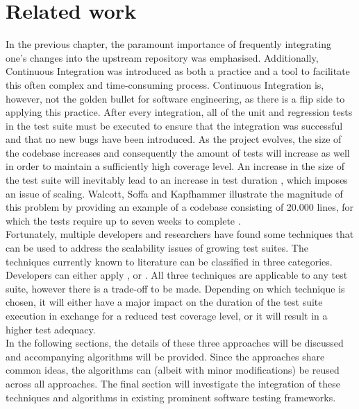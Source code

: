 
\chapter{Related work}
In the previous chapter, the paramount importance of frequently integrating one's changes into the upstream repository was emphasised. Additionally, Continuous Integration was introduced as both a practice and a tool to facilitate this often complex and time-consuming process. Continuous Integration is, however, not the golden bullet for software engineering, as there is a flip side to applying this practice. After every integration, all of the unit and regression tests in the test suite must be executed to ensure that the integration was successful and that no new bugs have been introduced. As the project evolves, the size of the codebase increases and consequently the amount of tests will increase as well in order to maintain a sufficiently high coverage level. An increase in the size of the test suite will inevitably lead to an increase in test duration \cite{evaluationoftestsuiteminimization}, which imposes an issue of scaling. Walcott, Soffa and Kapfhammer illustrate the magnitude of this problem by providing an example of a codebase consisting of 20.000 lines, for which the tests require up to seven weeks to complete \cite{10.1145/1146238.1146240}.\\

\noindent Fortunately, multiple developers and researchers have found some techniques that can be used to address the scalability issues of growing test suites. The techniques currently known to literature can be classified in three categories. Developers can either apply \emph{\tsm{}}, \emph{\tcs{}} or \emph{\tcp{}} \cite{evaluationoftestsuiteminimization}. All three techniques are applicable to any test suite, however there is a trade-off to be made. Depending on which technique is chosen, it will either have a major impact on the duration of the test suite execution in exchange for a reduced test coverage level, or it will result in a higher test adequacy.\\

\noindent In the following sections, the details of these three approaches will be discussed and accompanying algorithms will be provided. Since the approaches share common ideas, the algorithms can (albeit with minor modifications) be reused across all approaches. The final section will investigate the integration of these techniques and algorithms in existing prominent software testing frameworks.



